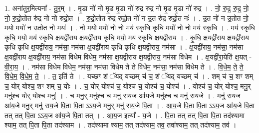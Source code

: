 \documentclass[17pt]{extarticle}
\begin{document}
1. अना॑तुर॒मित्यना᳚ - तु॒र॒म् । . मृ॒डा नो॑ नो मृ॒ड मृ॒डा नो॑ रुद्र रुद्र नो मृ॒ड मृ॒डा नो॑ रुद्र । . नो॒ रु॒द्र॒ रु॒द्र॒ नो॒ नो॒ रु॒द्रो॒तोत रु॑द्र नो नो रुद्रो॒त । . रु॒द्रो॒तोत रु॑द्र रुद्रो॒त नो॑ न उ॒त रु॑द्र रुद्रो॒त नः॑ । . उ॒त नो॑ न उ॒तोत नो॒ मयो॒ मयो॑ न उ॒तोत नो॒ मयः॑ । . नो॒ मयो॒ मयो॑ नो नो॒ मय॑ स्कृधि कृधि॒ मयो॑ नो नो॒ मय॑ स्कृधि । . मय॑ स्कृधि कृधि॒ मयो॒ मय॑ स्कृधि क्ष॒यद्वी॑राय क्ष॒यद्वी॑राय कृधि॒ मयो॒ मय॑ स्कृधि क्ष॒यद्वी॑राय । . कृ॒धि॒ क्ष॒यद्वी॑राय क्ष॒यद्वी॑राय कृधि कृधि क्ष॒यद्वी॑राय॒ नम॑सा॒ नम॑सा क्ष॒यद्वी॑राय कृधि कृधि क्ष॒यद्वी॑राय॒ नम॑सा । . क्ष॒यद्वी॑राय॒ नम॑सा॒ नम॑सा क्ष॒यद्वी॑राय क्ष॒यद्वी॑राय॒ नम॑सा विधेम विधेम॒ नम॑सा क्ष॒यद्वी॑राय क्ष॒यद्वी॑राय॒ नम॑सा विधेम । . क्ष॒यद्वी॑रा॒येति॑ क्ष॒यत् - वी॒रा॒य॒ । . नम॑सा विधेम विधेम॒ नम॑सा॒ नम॑सा विधेम ते ते विधेम॒ नम॑सा॒ नम॑सा विधेम ते । . वि॒धे॒म॒ ते॒ ते॒ वि॒धे॒म॒ वि॒धे॒म॒ ते॒ । . त॒ इति॑ ते । . यच्छꣳ शं ॅयद् यच्छम् च॑ च॒ शं ॅयद् यच्छम् च॑ । . शम् च॑ च॒ शꣳ शम् च॒ योर् योश्च॒ शꣳ शम् च॒ योः । . च॒ योर् योश्च॑ च॒ योश्च॑ च॒ योश्च॑ च॒ योश्च॑ । . योश्च॑ च॒ योर् योश्च॒ मनु॒र् मनु॑श्च॒ योर् योश्च॒ मनुः॑ । . च॒ मनु॒र् मनु॑श्च च॒ मनु॑ राय॒ज आ॑य॒जे मनु॑श्च च॒ मनु॑ राय॒जे । . मनु॑ राय॒ज आ॑य॒जे मनु॒र् मनु॑ राय॒जे पि॒ता पि॒ता ऽऽय॒जे मनु॒र् मनु॑ राय॒जे पि॒ता । . आ॒य॒जे पि॒ता पि॒ता ऽऽय॒ज आ॑य॒जे पि॒ता तत् तत् पि॒ता ऽऽय॒ज आ॑य॒जे पि॒ता तत् । . आ॒य॒ज इत्या᳚ - य॒जे । . पि॒ता तत् तत् पि॒ता पि॒ता तद॑श्यामा श्याम॒ तत् पि॒ता पि॒ता तद॑श्याम । . तद॑श्यामा श्याम॒ तत् तद॑श्याम॒ तव॒ तवा᳚श्याम॒ तत् तद॑श्याम॒ तव॑ । \newline
\end{document}
